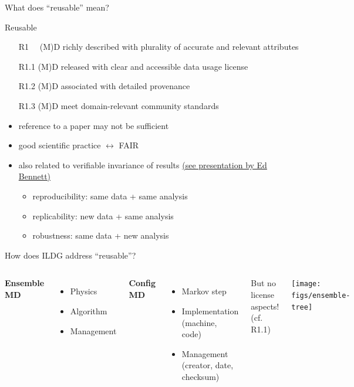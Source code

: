 \documentclass[aspectratio=169,xcolor=dvipsnames]{beamer}
\def\figs{figs2}
\begin{document}
\begin{frame}{What does ``reusable'' mean?}
  \begin{alertblock}{Reusable}
    \begin{itemize}
    \item[R1~~] (M)D richly described with plurality of accurate and relevant attributes
    \item[R1.1] (M)D released with clear and accessible data usage license
    \item[R1.2] (M)D associated with detailed provenance
    \item[R1.3] (M)D meet domain-relevant community standards
    \end{itemize}
  \end{alertblock}

  \begin{itemize}
  \item reference to a paper may not be sufficient
  \item good scientific practice $\leftrightarrow$ FAIR
  \item also related to verifiable invariance of results
    \hfill {\small \href{https://edbennett.github.io/uklft-talk-20220527/\#/2/1/4}{(see presentation by Ed Bennett)}}
    \begin{itemize}
    \item reproducibility: same data + same analysis
    \item replicability: new data + same analysis
    \item robustness: same data + new analysis
    \end{itemize}
  \end{itemize}

  \vfill

\end{frame}
\begin{frame}{How does ILDG address ``reusable''?}
  \begin{columns}[c] 
    {\bf Ensemble MD}
    \begin{itemize}
    \item Physics
    \item Algorithm
    \item Management
    \end{itemize}

    \vspace*{5mm}
    {\bf Config MD}
    \begin{itemize}
    \item Markov step
    \item Implementation (machine, code)
    \item Management (creator, date, checksum)
    \end{itemize}

    \vspace*{5mm}
    But \alert{no} license aspects! (cf. R1.1)

    \hspace*{-5mm}\texttt{[image: \\figs/ensemble-tree]}
  \end{columns}
\end{frame}
\end{document}
